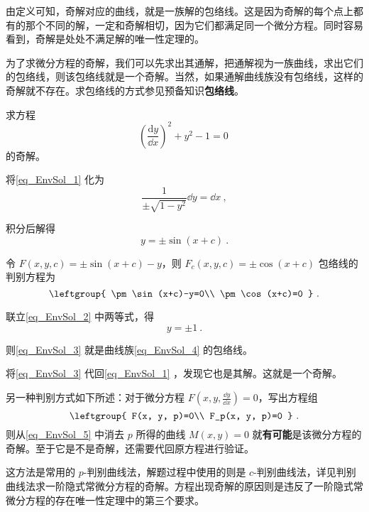由定义可知，奇解对应的曲线，就是一族解的包络线。这是因为奇解的每个点上都有的那个不同的解，一定和奇解相切，因为它们都满足同一个微分方程。同时容易看到，奇解是处处不满足解的唯一性定理的。

为了求微分方程的奇解，我们可以先求出其通解，把通解视为一族曲线，求出它们的包络线，则该包络线就是一个奇解。当然，如果通解曲线族没有包络线，这样的奇解就不存在。求包络线的方式参见预备知识\textbf{包络线}。

\begin{example}{}
求方程
\begin{equation}\label{eq_EnvSol_1}
(\frac{\mathrm{d} y}{\dd x})^2+y^2-1=0~
\end{equation}
的奇解。

将\autoref{eq_EnvSol_1} 化为
\begin{equation}
\frac{1}{\pm\sqrt{1-y^2}}\dd y=\dd x~,
\end{equation}

积分后解得
\begin{equation}\label{eq_EnvSol_4}
y=\pm\sin(x+c)~.
\end{equation}

令 $F(x, y, c)=\pm\sin(x+c)-y$，则 $F_c(x, y, c)=\pm\cos(x+c)$ 包络线的判别方程为
\begin{equation}\label{eq_EnvSol_2}
\leftgroup{
    \pm\sin(x+c)-y=0\\
    \pm\cos(x+c)=0
}~.
\end{equation}

联立\autoref{eq_EnvSol_2} 中两等式，得
\begin{equation}\label{eq_EnvSol_3}
y=\pm 1~.
\end{equation}

则\autoref{eq_EnvSol_3} 就是曲线族\autoref{eq_EnvSol_4} 的包络线。

将\autoref{eq_EnvSol_3} 代回\autoref{eq_EnvSol_1} ，发现它也是其解。这就是一个奇解。


\end{example}

另一种判别方式如下所述：对于微分方程 $F(x, y, \frac{\dd y}{\dd x})=0$，写出方程组
\begin{equation}\label{eq_EnvSol_5}
\leftgroup{
    F(x, y, p)=0\\
    F_p(x, y, p)=0
}~.
\end{equation}
则从\autoref{eq_EnvSol_5} 中消去 $p$ 所得的曲线 $M(x, y)=0$ 就\textbf{有可能}是该微分方程的奇解。至于它是不是奇解，还需要代回原方程进行验证。

这方法是常用的 $p$-判别曲线法，解题过程中使用的则是 $c$-判别曲线法，详见判别曲线法求一阶隐式常微分方程的奇解。方程出现奇解的原因则是违反了一阶隐式常微分方程的存在唯一性定理中的第三个要求。


